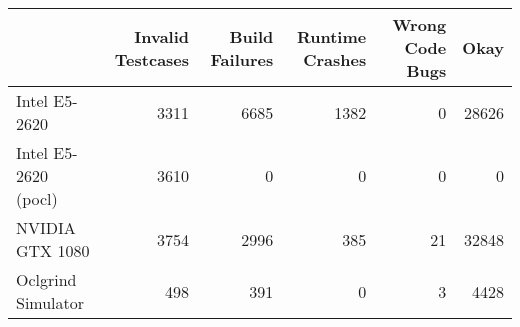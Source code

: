\begin{tabular}{lrrrrr}
\toprule
{} &  Invalid Testcases &  Build Failures &  Runtime Crashes &  Wrong Code Bugs &   Okay \\
\midrule
Intel E5-2620        &               3311 &            6685 &             1382 &                0 &  28626 \\
Intel E5-2620 (pocl) &               3610 &               0 &                0 &                0 &      0 \\
NVIDIA GTX 1080      &               3754 &            2996 &              385 &               21 &  32848 \\
Oclgrind Simulator   &                498 &             391 &                0 &                3 &   4428 \\
\bottomrule
\end{tabular}

